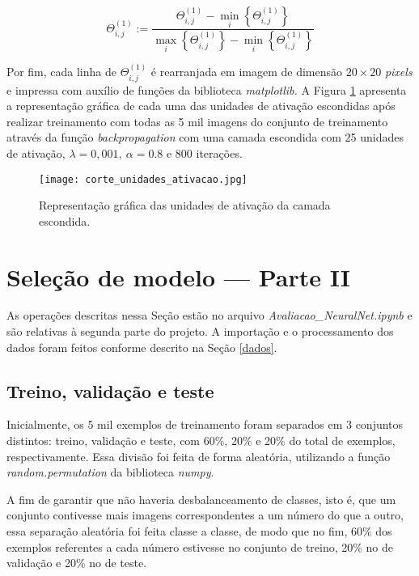 \documentclass[12pt]{article}
\begin{document}
\begin{equation} \label{scaling}
\Theta^{(1)}_{i,j} := \frac{ \Theta^{(1)}_{i,j} - \min\limits_i\left\{\Theta^{(1)}_{i,j}\right\}}{\max\limits_i\left\{\Theta^{(1)}_{i,j}\right\} - \min\limits_i\left\{\Theta^{(1)}_{i,j}\right\}}
\end{equation}

Por fim, cada linha de $\Theta^{(1)}_{i,j}$ é rearranjada em imagem de dimensão $20 \times 20$ \textit{pixels} e impressa com auxílio de funções da biblioteca \textit{matplotlib.} A Figura \ref{img_un_escond} apresenta a representação gráfica de cada uma das unidades de ativação escondidas após realizar treinamento com todas as 5 mil imagens do conjunto de treinamento através da função \textit{backpropagation} com uma camada escondida com 25 unidades de ativação, $\lambda = 0,001, \ \alpha = 0.8$ e 800 iterações.

\begin{figure}
\begin{center}
\texttt{[image: corte\_unidades\_ativacao.jpg]}
\caption{Representação gráfica das unidades de ativação da camada escondida.} \label{img_un_escond}
\end{center}
\end{figure}

\section{Seleção de modelo --- Parte II} \label{parte2}
As operações descritas nessa Seção estão no arquivo \textit{Avaliacao\_NeuralNet.ipynb} e são relativas à segunda parte do projeto. A importação e o processamento dos dados foram feitos conforme descrito na Seção \ref{dados}.


\subsection{Treino, validação e teste} \label{treino, val, teste}
\indent Inicialmente, os 5 mil exemplos de treinamento foram separados em 3 conjuntos distintos: treino, validação e teste, com 60\%, 20\% e 20\% do total de exemplos, respectivamente. Essa divisão foi feita de forma aleatória, utilizando a função \textit{random.permutation} da biblioteca \textit{numpy}.

A fim de garantir que não haveria desbalanceamento de classes, isto é, que um conjunto contivesse mais imagens correspondentes a um número do que a outro, essa separação aleatória foi feita classe a classe, de modo que no fim, 60\% dos exemplos referentes a cada número estivesse no conjunto de treino, 20\% no de validação e 20\% no de teste.
\end{document}
